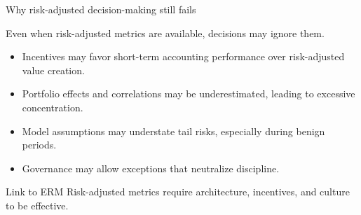 \documentclass[aspectratio=169, 10pt]{beamer} %
\begin{document}
\begin{frame}{Why risk-adjusted decision-making still fails}

Even when risk-adjusted metrics are available, decisions may ignore them.

\medskip

\begin{itemize}
  \item[$\bullet$] Incentives may favor short-term accounting performance over
  risk-adjusted value creation.

  \item[$\bullet$] Portfolio effects and correlations may be underestimated,
  leading to excessive concentration.

  \item[$\bullet$] Model assumptions may understate tail risks, especially
  during benign periods.

  \item[$\bullet$] Governance may allow exceptions that neutralize discipline.
\end{itemize}

\begin{block}{Link to ERM}
Risk-adjusted metrics require architecture, incentives, and culture
to be effective.
\end{block}

\end{frame}
\end{document}
